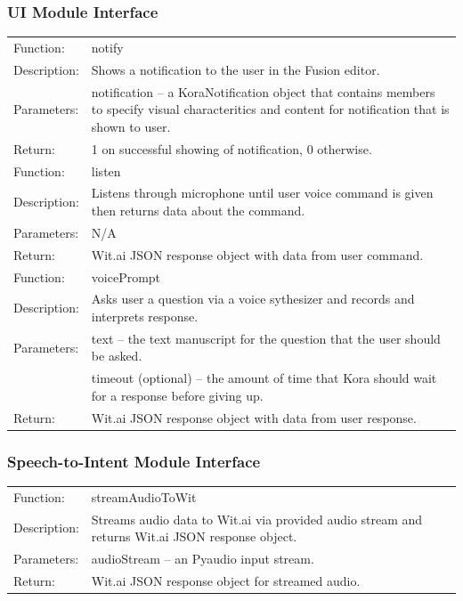 \documentclass[onecolumn, draftclsnofoot,10pt, compsoc]{IEEEtran}
\def \botname{Kora\xspace}
\begin{document}
        \subsubsection{UI Module Interface}
            \begin{tabular}[t]{l p{6in}}
                \hline
                Function: & notify \\
                Description: & Shows a notification to the user in the Fusion editor. \\
                Parameters: & notification -- a KoraNotification object that contains members to specify visual characteritics and content for notification that is shown to user. \\
                Return: & 1 on successful showing of notification, 0 otherwise. \\
                \hline
                Function: & listen \\
                Description: & Listens through microphone until user voice command is given then returns data about the command. \\
                Parameters: & N/A \\
                Return: & Wit.ai JSON response object with data from user command. \\
                \hline
                Function: & voicePrompt \\
                Description: & Asks user a question via a voice sythesizer and records and interprets response. \\
                Parameters: & text -- the text manuscript for the question that the user should be asked. \\
                            & timeout (optional) -- the amount of time that \botname should wait for a response before giving up. \\
                Return: & Wit.ai JSON response object with data from user response. \\
                \hline
            \end{tabular}

        \subsubsection{Speech-to-Intent Module Interface}
            \begin{tabular}[t]{l p{6in}}
                \hline
                Function: &  streamAudioToWit \\
                Description: & Streams audio data to Wit.ai via provided audio stream and returns Wit.ai JSON response object. \\
                Parameters: & audioStream -- an Pyaudio input stream. \\
                Return: & Wit.ai JSON response object for streamed audio. \\
                \hline
            \end{tabular}
            
\end{document}
